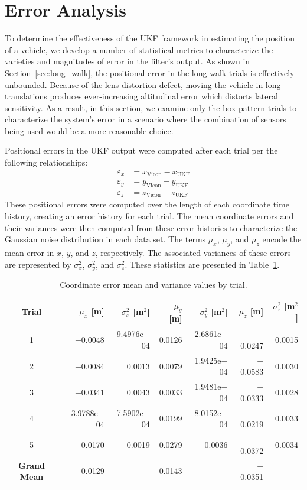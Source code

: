 \section{Error Analysis}

To determine the effectiveness of the UKF framework in estimating the position of a vehicle, we develop a number of statistical metrics to characterize the varieties and magnitudes of error in the filter's output. As shown in Section~\ref{sec:long_walk}, the positional error in the long walk trials is effectively unbounded. Because of the lens distortion defect, moving the vehicle in long translations produces ever-increasing altitudinal error which distorts lateral sensitivity. As a result, in this section, we examine only the box pattern trials to characterize the system's error in a scenario where the combination of sensors being used would be a more reasonable choice.

Positional errors in the UKF output were computed after each trial per the following relationships:
%
\begin{align}
\varepsilon_{x} &= x_{\text{Vicon}} - x_{\text{UKF}} \\
\varepsilon_{y} &= y_{\text{Vicon}} - y_{\text{UKF}} \\
\varepsilon_{z} &= z_{\text{Vicon}} - z_{\text{UKF}}
\end{align}
%
These positional errors were computed over the length of each coordinate time history, creating an error history for each trial. The mean coordinate errors and their variances were then computed from these error histories to characterize the Gaussian noise distribution in each data set. The terms $\mu_{x}$, $\mu_{y}$, and $\mu_{z}$ encode the mean error in $x$, $y$, and $z$, respectively. The associated variances of these errors are represented by $\sigma_{x}^{2}$, $\sigma_{y}^{2}$, and $\sigma_{z}^{2}$. These statistics are presented in Table~\ref{tab:means_and_vars}.

\begin{table}[h]\centering
\caption[Coordinate Error Mean and Variance Values]{Coordinate error mean and variance values by trial.}
\begin{tabular}[c]{crr|rr|rr}
\toprule
Trial & $\mu_{x}$ [m] & $\sigma_{x}^{2}$ [m$^{2}$] & $\mu_{y}$ [m] & $\sigma_{y}^{2}$ [m$^{2}$] & $\mu_{z}$ [m] & $\sigma_{z}^{2}$ [m$^{2}$] \\
\hline
1 & $-$0.0048 & 9.4976e$-$04 & 0.0126 & 2.6861e$-$04 & $-$0.0247 & 0.0015 \\
2 & $-$0.0084 & 0.0013 & 0.0079 & 1.9425e$-$04 & $-$0.0583 & 0.0030 \\
3 & $-$0.0341 & 0.0043 & 0.0033 & 1.9481e$-$04 & $-$0.0333 & 0.0028 \\
4 & $-$3.9788e$-$04 & 7.5902e$-$04 & 0.0199 & 8.0152e$-$04 & $-$0.0219 & 0.0033 \\
5 & $-$0.0170 & 0.0019 & 0.0279 & 0.0036 & $-$0.0372 & 0.0034 \\
\hline
\textbf{Grand Mean} & $-$0.0129 &  & 0.0143 &  & $-$0.0351 & \\
\bottomrule
\end{tabular}
\label{tab:means_and_vars}
\end{table}

